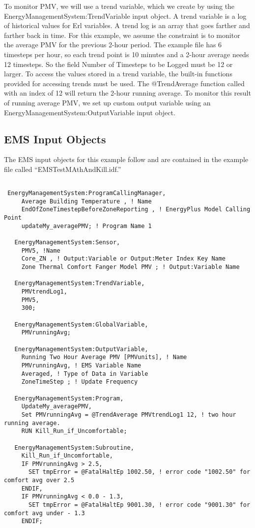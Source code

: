 To monitor PMV, we will use a trend variable, which we create by using the EnergyManagementSystem:TrendVariable input object. A trend variable is a log of historical values for Erl variables. A trend log is an array that goes farther and farther back in time. For this example, we assume the constraint is to monitor the average PMV for the previous 2-hour period. The example file has 6 timesteps per hour, so each trend point is 10 minutes and a 2-hour average needs 12 timesteps. So the field Number of Timesteps to be Logged must be 12 or larger. To access the values stored in a trend variable, the built-in functions provided for accessing trends must be used. The @TrendAverage function called with an index of 12 will return the 2-hour running average. To monitor this result of running average PMV, we set up custom output variable using an EnergyManagementSystem:OutputVariable input object.

\subsection{EMS Input Objects}\label{ems-input-objects-006}

The EMS input objects for this example follow and are contained in the example file called ``EMSTestMAthAndKill.idf.''

\begin{lstlisting}

 EnergyManagementSystem:ProgramCallingManager,
     Average Building Temperature , ! Name
     EndOfZoneTimestepBeforeZoneReporting , ! EnergyPlus Model Calling Point
     updateMy_averagePMV; ! Program Name 1

   EnergyManagementSystem:Sensor,
     PMV5, !Name
     Core_ZN , ! Output:Variable or Output:Meter Index Key Name
     Zone Thermal Comfort Fanger Model PMV ; ! Output:Variable Name

   EnergyManagementSystem:TrendVariable,
     PMVtrendLog1,
     PMV5,
     300;

   EnergyManagementSystem:GlobalVariable,
     PMVrunningAvg;

   EnergyManagementSystem:OutputVariable,
     Running Two Hour Average PMV [PMVunits], ! Name
     PMVrunningAvg, ! EMS Variable Name
     Averaged, ! Type of Data in Variable
     ZoneTimeStep ; ! Update Frequency

   EnergyManagementSystem:Program,
     UpdateMy_averagePMV,
     Set PMVrunningAvg = @TrendAverage PMVtrendLog1 12, ! two hour running average.
     RUN Kill_Run_if_Uncomfortable;

   EnergyManagementSystem:Subroutine,
     Kill_Run_if_Uncomfortable,
     IF PMVrunningAvg > 2.5,
       SET tmpError = @FatalHaltEp 1002.50, ! error code "1002.50" for comfort avg over 2.5
     ENDIF,
     IF PMVrunningAvg < 0.0 - 1.3,
       SET tmpError = @FatalHaltEp 9001.30, ! error code "9001.30" for comfort avg under - 1.3
     ENDIF;
\end{lstlisting}
